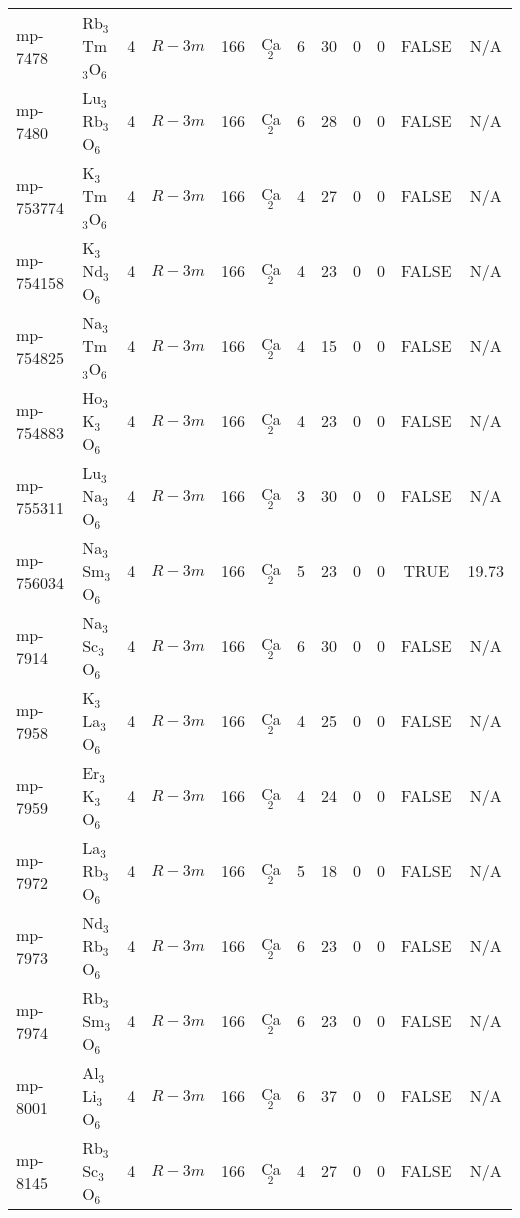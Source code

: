 {\begin{longtable}{llcccccccccc}
    mp-7478 & Rb$_{3}$Tm$_{3}$O$_{6}$ & 4     & $R-3m$ & 166   & Ca$_{2}$ & 6     & 30    & 0     & 0     & FALSE & N/A \\
    mp-7480 & Lu$_{3}$Rb$_{3}$O$_{6}$ & 4     & $R-3m$ & 166   & Ca$_{2}$ & 6     & 28    & 0     & 0     & FALSE & N/A \\
    mp-753774 & K$_{3}$Tm$_{3}$O$_{6}$ & 4     & $R-3m$ & 166   & Ca$_{2}$ & 4     & 27    & 0     & 0     & FALSE & N/A \\
    mp-754158 & K$_{3}$Nd$_{3}$O$_{6}$ & 4     & $R-3m$ & 166   & Ca$_{2}$ & 4     & 23    & 0     & 0     & FALSE & N/A \\
    mp-754825 & Na$_{3}$Tm$_{3}$O$_{6}$ & 4     & $R-3m$ & 166   & Ca$_{2}$ & 4     & 15    & 0     & 0     & FALSE & N/A \\
    mp-754883 & Ho$_{3}$K$_{3}$O$_{6}$ & 4     & $R-3m$ & 166   & Ca$_{2}$ & 4     & 23    & 0     & 0     & FALSE & N/A \\
    mp-755311 & Lu$_{3}$Na$_{3}$O$_{6}$ & 4     & $R-3m$ & 166   & Ca$_{2}$ & 3     & 30    & 0     & 0     & FALSE & N/A \\
    mp-756034 & Na$_{3}$Sm$_{3}$O$_{6}$ & 4     & $R-3m$ & 166   & Ca$_{2}$ & 5     & 23    & 0     & 0     & TRUE  & 19.73  \\
    mp-7914 & Na$_{3}$Sc$_{3}$O$_{6}$ & 4     & $R-3m$ & 166   & Ca$_{2}$ & 6     & 30    & 0     & 0     & FALSE & N/A \\
    mp-7958 & K$_{3}$La$_{3}$O$_{6}$ & 4     & $R-3m$ & 166   & Ca$_{2}$ & 4     & 25    & 0     & 0     & FALSE & N/A \\
    mp-7959 & Er$_{3}$K$_{3}$O$_{6}$ & 4     & $R-3m$ & 166   & Ca$_{2}$ & 4     & 24    & 0     & 0     & FALSE & N/A \\
    mp-7972 & La$_{3}$Rb$_{3}$O$_{6}$ & 4     & $R-3m$ & 166   & Ca$_{2}$ & 5     & 18    & 0     & 0     & FALSE & N/A \\
    mp-7973 & Nd$_{3}$Rb$_{3}$O$_{6}$ & 4     & $R-3m$ & 166   & Ca$_{2}$ & 6     & 23    & 0     & 0     & FALSE & N/A \\
    mp-7974 & Rb$_{3}$Sm$_{3}$O$_{6}$ & 4     & $R-3m$ & 166   & Ca$_{2}$ & 6     & 23    & 0     & 0     & FALSE & N/A \\
    mp-8001 & Al$_{3}$Li$_{3}$O$_{6}$ & 4     & $R-3m$ & 166   & Ca$_{2}$ & 6     & 37    & 0     & 0     & FALSE & N/A \\
    mp-8145 & Rb$_{3}$Sc$_{3}$O$_{6}$ & 4     & $R-3m$ & 166   & Ca$_{2}$ & 4     & 27    & 0     & 0     & FALSE & N/A \\

\end{longtable}}
